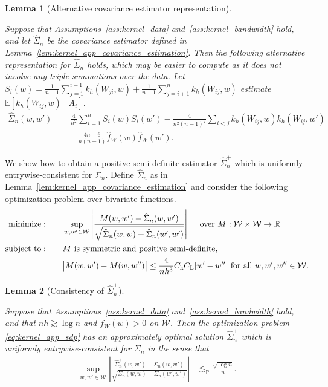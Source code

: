 \documentclass[11pt,lof]{puthesis}
\renewcommand{\P}{\ensuremath{\mathbb{P}}}
\newcommand{\R}{\ensuremath{\mathbb{R}}}
\newcommand{\E}{\ensuremath{\mathbb{E}}}
\newcommand{\rL}{\ensuremath{\mathrm{L}}}
\newcommand{\rk}{\ensuremath{\mathrm{k}}}
\newcommand{\cW}{\ensuremath{\mathcal{W}}}
\DeclareMathOperator*{\minimize}{minimize:}
\DeclareMathOperator*{\subjectto}{subject\ to:}
\theoremstyle{break}
\newtheorem{lemma}{Lemma}[section]
\theoremstyle{proof}
\begin{document}
\begin{lemma}[Alternative covariance estimator representation]
  \label{lem:kernel_app_alternative_covariance_estimator}

  Suppose that Assumptions~\ref{ass:kernel_data}
  and~\ref{ass:kernel_bandwidth} hold,
  and let $\hat \Sigma_n$
  be the covariance estimator defined
  in Lemma~\ref{lem:kernel_app_covariance_estimation}.
  Then the following alternative representation
  for $\hat \Sigma_n$ holds,
  which may be easier to compute
  as it does not involve any triple summations
  over the data.
  Let $S_i(w) = \frac{1}{n-1}
  \sum_{j = 1}^{i-1} k_h(W_{j i}, w)
  + \frac{1}{n-1} \sum_{j = i+1}^n k_h(W_{i j}, w)$
  estimate $\E[k_h(W_{i j},w) \mid A_i]$.
  \begin{align*}
    \hat \Sigma_n(w,w')
    &=
    \frac{4}{n^2}
    \sum_{i=1}^n
    S_i(w) S_i(w')
    - \frac{4}{n^2(n-1)^2}
    \sum_{i<j}
    k_h(W_{i j},w)
    k_h(W_{i j},w') \\
    &\quad-
    \frac{4n-6}{n(n-1)}
    \hat f_W(w)
    \hat f_W(w').
  \end{align*}
\end{lemma}

We show how to obtain a positive semi-definite estimator $\hat \Sigma_n^+$
which is uniformly entrywise-consistent for $\Sigma_n$. Define $\hat \Sigma_n$
as in Lemma~\ref{lem:kernel_app_covariance_estimation} and consider the
following
optimization problem over bivariate functions.
%
\begin{equation}
  \label{eq:kernel_app_sdp}
  \begin{aligned}
    \minimize
    \qquad
    & \sup_{w,w' \in \cW}
    \left|
      \frac{M(w,w') - \hat\Sigma_n(w,w')}
      {\sqrt{\hat \Sigma_n(w,w) + \hat \Sigma_n(w',w')}}
    \right|
    \quad \textup{ over } M: \cW \times \cW \to \R
    \\
    \subjectto
    \qquad
    & M \textup{ is symmetric and positive semi-definite}, \\
    & \big|M(w,w') - M(w, w'')\big|
    \leq \frac{4}{n h^3}
    C_\rk C_\rL
    |w'-w''|
    \textup{ for all }
    w, w', w'' \in \cW.
  \end{aligned}
\end{equation}

\begin{lemma}[Consistency of $\hat \Sigma_n^+$]
  \label{lem:kernel_app_sdp}

  Suppose that Assumptions~\ref{ass:kernel_data}
  and~\ref{ass:kernel_bandwidth} hold, and that
  $n h \gtrsim \log n$ and $f_W(w) > 0$ on $\cW$.
  Then the optimization problem \eqref{eq:kernel_app_sdp}
  has an approximately optimal solution $\hat\Sigma_n^+$
  which is uniformly entrywise-consistent
  for $\Sigma_n$ in the sense that
  \begin{align*}
    \sup_{w,w' \in \cW}
    \left|
      \frac{\hat \Sigma_n^+(w,w') - \Sigma_n(w,w')}
      {\sqrt{\Sigma_n(w,w) + \Sigma_n(w',w')}}
    \right|
    &\lesssim_\P
    \frac{\sqrt{\log n}}{n}.
  \end{align*}

\end{lemma}
\end{document}
